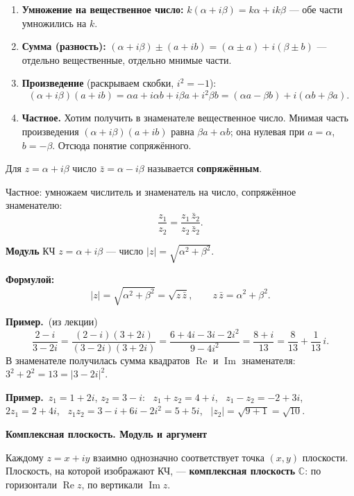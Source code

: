 \documentclass[a4paper,11pt]{article}
\newcommand{\C}{\mathbb{C}}
\DeclareMathOperator{\Rez}{Re}
\DeclareMathOperator{\Imz}{Im}
\newcommand{\fm}{\par\noindent\textbf{\textcolor{oprc!85!black}{Формулой:}}}
\newcommand{\prim}{\par\smallskip\noindent\textbf{\textcolor{teoc!80!black}{Пример.}}\ }
\newcommand{\podr}[1]{\par\needspace{8\baselineskip}\medskip
  {\large\bfseries\textcolor{oprc!80!black}{#1}}\par\nopagebreak\smallskip}
\begin{document}
\begin{enumerate}[leftmargin=*]
  \item \textbf{Умножение на вещественное число:} $k(\alpha + i\beta) = k\alpha + i k\beta$ --- обе части умножились на $k$.
  \item \textbf{Сумма (разность):} $(\alpha + i\beta) \pm (a + ib) = (\alpha \pm a) + i(\beta \pm b)$ --- отдельно вещественные, отдельно мнимые части.
  \item \textbf{Произведение} (раскрываем скобки, $i^2 = -1$):
        \[ (\alpha + i\beta)(a + ib) = \alpha a + i\alpha b + i\beta a + i^2 \beta b = (\alpha a - \beta b) + i(\alpha b + \beta a). \]
  \item \textbf{Частное.} Хотим получить в знаменателе вещественное число. Мнимая часть произведения $(\alpha + i\beta)(a + ib)$
        равна $\beta a + \alpha b$; она нулевая при $a = \alpha$, $b = -\beta$. Отсюда понятие сопряжённого.
\end{enumerate}

\begin{opr}
Для $z = \alpha + i\beta$ число $\bar z = \alpha - i\beta$ называется \textbf{сопряжённым}.
\end{opr}

Частное: умножаем числитель и знаменатель на число, сопряжённое знаменателю:
\[
  \frac{z_1}{z_2} = \frac{z_1\, \bar z_2}{z_2\, \bar z_2}.
\]

\begin{opr}[модуль КЧ]
\textbf{Модуль} КЧ $z = \alpha + i\beta$ --- число $|z| = \sqrt{\alpha^2 + \beta^2}$.
\fm
\[
  |z| = \sqrt{\alpha^2 + \beta^2} = \sqrt{z\, \bar z}, \qquad z\, \bar z = \alpha^2 + \beta^2.
\]
\end{opr}

\prim (из лекции)
\[
  \frac{2 - i}{3 - 2i} = \frac{(2 - i)(3 + 2i)}{(3 - 2i)(3 + 2i)} = \frac{6 + 4i - 3i - 2i^2}{9 - 4i^2} = \frac{8 + i}{13} = \frac{8}{13} + \frac{1}{13}\, i.
\]
В знаменателе получилась сумма квадратов $\Rez$ и $\Imz$ знаменателя: $3^2 + 2^2 = 13 = |3 - 2i|^2$.

\prim $z_1 = 1 + 2i$, $z_2 = 3 - i$: \
$z_1 + z_2 = 4 + i$, \ $z_1 - z_2 = -2 + 3i$, \ $2z_1 = 2 + 4i$, \
$z_1 z_2 = 3 - i + 6i - 2i^2 = 5 + 5i$, \ $|z_2| = \sqrt{9 + 1} = \sqrt{10}$.

\podr{Комплексная плоскость. Модуль и аргумент}

Каждому $z = x + iy$ взаимно однозначно соответствует точка $(x, y)$ плоскости. Плоскость, на которой изображают КЧ, ---
\textbf{комплексная плоскость} $\C$: по горизонтали $\Rez z$, по вертикали $\Imz z$.
\end{document}
